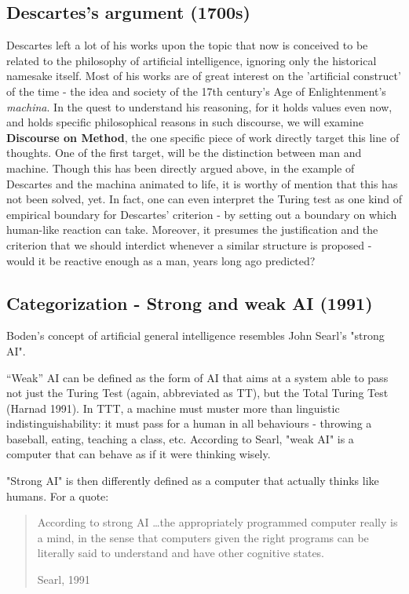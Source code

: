\subsection{Descartes's argument (1700s)}
Descartes left a lot of his works upon the topic that now is conceived to be related to the philosophy of artificial intelligence, ignoring only the historical namesake itself. Most of his works are of great interest on the 'artificial construct' of the time - the idea and society of the 17th century's Age of Enlightenment's \textit{machina}. In the quest to understand his reasoning, for it holds values even now, and holds specific philosophical reasons in such discourse, we will examine \textbf{Discourse on Method}, the one specific piece of work directly target this line of thoughts. One of the first target, will be the distinction between man and machine. Though this has been directly argued above, in the example of Descartes and the machina animated to life, it is worthy of mention that this has not been solved, yet. In fact, one can even interpret the Turing test as one kind of empirical boundary for Descartes' criterion - by setting out a boundary on which human-like reaction can take. Moreover, it presumes the justification and the criterion that we should interdict whenever a similar structure is proposed - would it be reactive enough as a man, years long ago predicted?
\subsection{Categorization - Strong and weak AI (1991)}
Boden's concept of artificial general intelligence resembles John Searl's "strong AI".

“Weak” AI can be defined as the form of AI that aims at a system able to pass not just the Turing Test (again, abbreviated as TT), but the Total Turing Test (Harnad 1991). In TTT, a machine must muster more than linguistic indistinguishability: it must pass for a human in all behaviours - throwing a baseball, eating, teaching a class, etc. According to Searl, "weak AI" is a computer that can behave as if it were thinking wisely.

"Strong AI" is then differently defined as a computer that actually thinks like humans. For a quote:

\blockquote[Searl, 1991]{According to strong AI \dots the appropriately programmed computer really is a mind, in the sense that computers given the right programs can be literally said to understand and have other cognitive states.}

